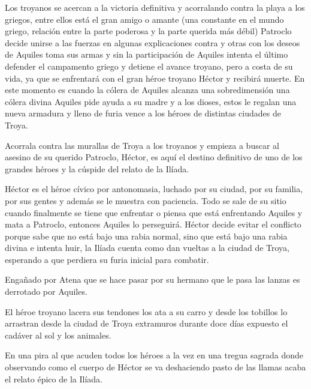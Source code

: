 Los troyanos se acercan a la victoria definitiva y acorralando contra la playa a los griegos, entre ellos está el gran amigo o amante (una constante en el mundo griego, relación entre la parte poderosa y la parte querida más débil) Patroclo decide unirse a las fuerzas en algunas explicaciones contra y otras con los deseos de Aquiles toma sus armas y sin la participación de Aquiles intenta el último defender el campamento griego y detiene el avance troyano, pero a costa de su vida, ya que se enfrentará con el gran héroe troyano Héctor y recibirá muerte. En este momento es cuando la cólera de Aquiles alcanza una sobredimensión una cólera divina Aquiles pide ayuda a su madre y a los dioses, estos le regalan una nueva armadura y lleno de furia vence a los héroes de distintas ciudades de Troya.

Acorrala contra las murallas de Troya a los troyanos y empieza a buscar al asesino de su querido Patroclo, Héctor, es aquí el destino definitivo de uno de los grandes héroes y la cúspide del relato de la Ilíada.

Héctor es el héroe cívico por antonomasia, luchado por su ciudad, por su familia, por sus gentes y además se le muestra con paciencia. Todo se sale de su sitio cuando finalmente se tiene que enfrentar o piensa que está enfrentando Aquiles y mata a Patroclo, entonces Aquiles lo perseguirá. Héctor decide evitar el conflicto porque sabe que no está bajo una rabia normal, sino que está bajo una rabia divina e intenta huir, la Ilíada cuenta como dan vueltas a la ciudad de Troya, esperando a que perdiera su furia inicial para combatir.

Engañado por Atena que se hace pasar por su hermano que le pasa las lanzas es derrotado por Aquiles.

El héroe troyano lacera sus tendones los ata a su carro y desde los tobillos lo arrastran desde la ciudad de Troya extramuros durante doce días expuesto el cadáver al sol y los animales.

En una pira al que acuden todos los héroes a la vez en una tregua sagrada donde observando como el cuerpo de Héctor se va deshaciendo pasto de las llamas acaba el relato épico de la Ilíada.
